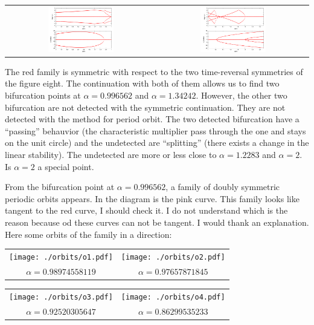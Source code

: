 \documentclass{article}
\begin{document}
\begin{tabular}{cc}
\includegraphics[width=0.45\textwidth]{cm_down.pdf}&
\includegraphics[width=0.45\textwidth]{cm_up.pdf}
\end{tabular}

The red family is symmetric with respect to the two time-reversal symmetries of the figure eight. The continuation 
with both of them allows us to find two bifurcation points at $\alpha= 0.996562$  and $\alpha= 1.34242$. However, the other two bifurcation 
are not detected with the symmetric continuation. They are not detected with the method for period orbit. The two detected bifurcation have a 
``passing'' behauvior (the characteristic multiplier pass through the one and stays on the unit circle) and the undetected are ``splitting'' (there exists a
change in the linear stability). The undetected are more or less close to $\alpha=1.2283$ and $\alpha=2$. Is $\alpha=2$ a special point.

From the bifurcation point at $\alpha= 0.996562$, a family of doubly symmetric periodic orbits appears. In the diagram is the pink curve. 
This family looks like tangent to the red curve, I should check it. I do not understand which is the reason because od these curves can not be tangent. I would thank an explanation.  Here some orbits of the family in a direction:

\begin{tabular}{cc}
\texttt{[image: ./orbits/o1.pdf]}&
\texttt{[image: ./orbits/o2.pdf]} \\
$\alpha= 0.98974558119$&$ \alpha=0.97657871845 $
\end{tabular}

\begin{tabular}{cc}
\texttt{[image: ./orbits/o3.pdf]}&
\texttt{[image: ./orbits/o4.pdf]}\\
$\alpha= 0.92520305647$&$ \alpha= 0.86299535233$
\end{tabular}
\end{document}
